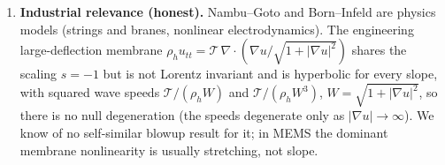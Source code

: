 \begin{enumerate}[leftmargin=*,itemsep=2pt]
  for odd $d$), so smooth cones, if they exist, are isolated. We have not
  verified this.
\item \textbf{Industrial relevance (honest).} Nambu--Goto and Born--Infeld
  are physics models (strings and branes, nonlinear electrodynamics). The
  engineering large-deflection membrane
  $\rho_h u_{tt}=\mathcal T\,\nabla\!\cdot(\nabla u/\sqrt{1+|\nabla u|^2})$
  shares the scaling $s=-1$ but is not Lorentz invariant and is hyperbolic
  for every slope, with squared wave speeds
  $\mathcal T/(\rho_h W)$ and $\mathcal T/(\rho_h W^3)$, $W=\sqrt{1+|\nabla u|^2}$,
  so there is no null degeneration (the speeds degenerate only as
  $|\nabla u|\to\infty$). We know of no self-similar blowup result
  for it; in MEMS the dominant membrane nonlinearity is usually stretching,
  not slope.
\end{enumerate}
